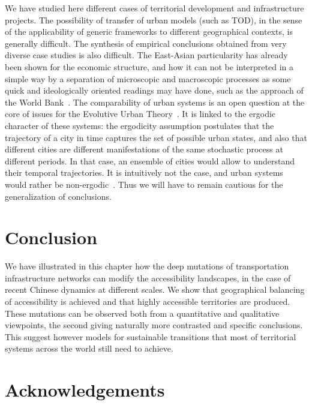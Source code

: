 We have studied here different cases of territorial development and infrastructure projects. The possibility of transfer of urban models (such as TOD), in the sense of the applicability of generic frameworks to different geographical contexts, is generally difficult. The synthesis of empirical conclusions obtained from very diverse case studies is also difficult. The East-Asian particularity has already been shown for the economic structure, and how it can not be interpreted in a simple way by a separation of microscopic and macroscopic processes as some quick and ideologically oriented readings may have done, such as the approach of the World Bank~\citep{amsden1994isn}. The comparability of urban systems is an open question at the core of issues for the Evolutive Urban Theory~\citep{pumain2015multilevel}. It is linked to the ergodic character of these systems: the ergodicity assumption postulates that the trajectory of a city in time captures the set of possible urban states, and also that different cities are different manifestations of the same stochastic process at different periods. In that case, an ensemble of cities would allow to understand their temporal trajectories. It is intuitively not the case, and urban systems would rather be non-ergodic~\cite{pumain2012urban}. Thus we will have to remain cautious for the generalization of conclusions.




\section*{Conclusion}

We have illustrated in this chapter how the deep mutations of transportation infrastructure networks can modify the accessibility landscapes, in the case of recent Chinese dynamics at different scales. We show that geographical balancing of accessibility is achieved and that highly accessible territories are produced. These mutations can be observed both from a quantitative and qualitative viewpoints, the second giving naturally more contrasted and specific conclusions. This suggest however models for sustainable transitions that most of territorial systems across the world still need to achieve.



\section*{Acknowledgements}

